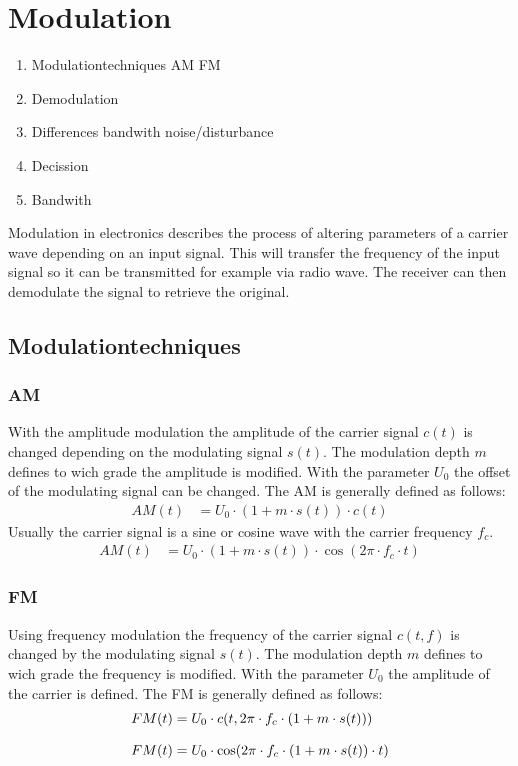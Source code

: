 \section{Modulation}\label{sec:theory:mod}

\begin{enumerate}
  \item Modulationtechniques
  \subitem AM
  \subitem FM
  \item Demodulation
  \item Differences
  \subitem bandwith
  \subitem noise/disturbance
  \item Decission
  \item Bandwith
\end{enumerate}
%
Modulation in electronics describes the process of altering parameters of a carrier wave depending on an input signal. This will transfer the frequency of the input signal so it can be transmitted for example via radio wave. The receiver can then demodulate the signal to retrieve the original.

\subsection{Modulationtechniques}

\subsubsection*{AM}
With the amplitude modulation the amplitude of the carrier signal $c(t)$ is changed depending on the modulating signal $s(t)$. The modulation depth $m$ defines to wich grade the amplitude is modified. With the parameter $U_0$ the offset of the modulating signal can be changed.\p
The AM is generally defined as follows:
%
\begin{align}
  AM(t) &= U_0 \cdot (1 + m \cdot s(t)) \cdot c(t)
\end{align}
%
Usually the carrier signal is a sine or cosine wave with the carrier frequency $f_c$.
%
\begin{align}
  AM(t) &= U_0 \cdot (1 + m \cdot s(t)) \cdot \cos (2 \pi \cdot f_c \cdot t)
\end{align}
%
\subsubsection*{FM}
%
Using frequency modulation the frequency of the carrier signal $c(t, f)$ is changed by the modulating signal $s(t)$. The modulation depth $m$ defines to wich grade the frequency is modified. With the parameter $U_0$ the amplitude of the carrier is defined.\p
The FM is generally defined as follows:
%
\begin{align}
  FM(t) &= U_0 \cdot c(t, 2 \pi \cdot f_c \cdot (1 + m \cdot s(t)))\pmath
  FM(t) &= U_0 \cdot \cos (2 \pi \cdot f_c \cdot (1 + m \cdot s(t)) \cdot t)
\end{align}

